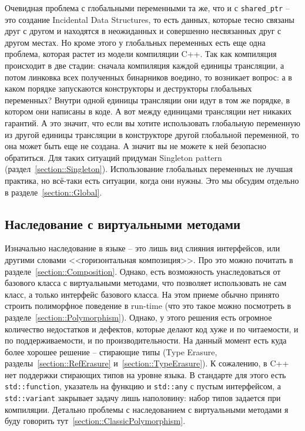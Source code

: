 Очевидная проблема с глобальными переменными та же, что и с \verb"shared_ptr" -- это создание Incidental Data Structures, то есть данных, которые тесно связаны друг с другом и находятся в неожиданных и совершенно несвязанных друг с другом местах.
Но кроме этого у глобальных переменных есть еще одна проблема, которая растет из модели компиляции C++.
Так как компиляция происходит в две стадии: сначала компиляция каждой единицы трансляции, а потом линковка всех полученных бинарников воедино, то возникает вопрос: а в каком порядке запускаются конструкторы и деструкторы глобальных переменных?
Внутри одной единицы трансляции они идут в том же порядке, в котором они написаны в коде.
А вот между единицами трансляции нет никаких гарантий.
А это значит, что если вы хотите использовать глобальную переменную из другой единицы трансляции в конструкторе другой глобальной переменной, то она может быть еще не создана.
А значит вы не можете к ней безопасно обратиться.
Для таких ситуаций придуман Singleton pattern (раздел~\ref{section::Singleton}).
Использование глобальных переменных не лучшая практика, но всё-таки есть ситуации, когда они нужны.
Это мы обсудим отдельно в разделе~\ref{section::Global}.

\subsection{Наследование с виртуальными методами}

Изначально наследование в языке -- это лишь вид слияния интерфейсов, или другими словами <<горизонтальная композиция>>. Про это можно почитать в разделе~\ref{section::Composition}.
Однако, есть возможность унаследоваться от базового класса с виртуальными методами, что позволяет использовать не сам класс, а только интерфейс базового класса.
На этом приеме обычно принято строить полиморфное поведение в run-time (что это такое можно посмотреть в разделе~\ref{section::Polymorphism}).
Однако, у этого решения есть огромное количество недостатков и дефектов, которые делают код хуже и по читаемости, и по поддерживаемости, и по производительности.
На данный момент есть куда более хорошее решение -- стирающие типы (Type Erasure, разделы~\ref{section::RefErasure} и~\ref{section::TypeErasure}).
К сожалению, в C++ нет поддержки стирающих типов на уровне языка. В стандарте для этого есть \verb"std::function", указатель на функцию и \verb"std::any" с пустым интерфейсом, а \verb"std::variant" закрывает задачу лишь наполовину: набор типов задается при компиляции.
Детально проблемы с наследованием с виртуальными методами я буду говорить тут~\ref{section::ClassicPolymorphism}.

